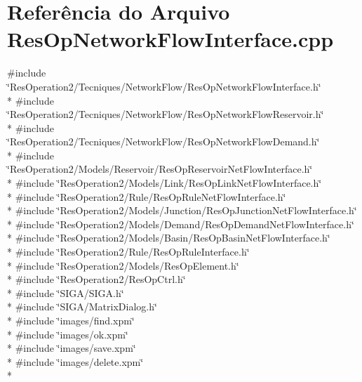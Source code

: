 \section{Referência do Arquivo Res\+Op\+Network\+Flow\+Interface.\+cpp}
\label{_res_op_network_flow_interface_8cpp}
{\ttfamily \#include \char`\"{}Res\+Operation2/\+Tecniques/\+Network\+Flow/\+Res\+Op\+Network\+Flow\+Interface.\+h\char`\"{}}\\*
{\ttfamily \#include \char`\"{}Res\+Operation2/\+Tecniques/\+Network\+Flow/\+Res\+Op\+Network\+Flow\+Reservoir.\+h\char`\"{}}\\*
{\ttfamily \#include \char`\"{}Res\+Operation2/\+Tecniques/\+Network\+Flow/\+Res\+Op\+Network\+Flow\+Demand.\+h\char`\"{}}\\*
{\ttfamily \#include \char`\"{}Res\+Operation2/\+Models/\+Reservoir/\+Res\+Op\+Reservoir\+Net\+Flow\+Interface.\+h\char`\"{}}\\*
{\ttfamily \#include \char`\"{}Res\+Operation2/\+Models/\+Link/\+Res\+Op\+Link\+Net\+Flow\+Interface.\+h\char`\"{}}\\*
{\ttfamily \#include \char`\"{}Res\+Operation2/\+Rule/\+Res\+Op\+Rule\+Net\+Flow\+Interface.\+h\char`\"{}}\\*
{\ttfamily \#include \char`\"{}Res\+Operation2/\+Models/\+Junction/\+Res\+Op\+Junction\+Net\+Flow\+Interface.\+h\char`\"{}}\\*
{\ttfamily \#include \char`\"{}Res\+Operation2/\+Models/\+Demand/\+Res\+Op\+Demand\+Net\+Flow\+Interface.\+h\char`\"{}}\\*
{\ttfamily \#include \char`\"{}Res\+Operation2/\+Models/\+Basin/\+Res\+Op\+Basin\+Net\+Flow\+Interface.\+h\char`\"{}}\\*
{\ttfamily \#include \char`\"{}Res\+Operation2/\+Rule/\+Res\+Op\+Rule\+Interface.\+h\char`\"{}}\\*
{\ttfamily \#include \char`\"{}Res\+Operation2/\+Models/\+Res\+Op\+Element.\+h\char`\"{}}\\*
{\ttfamily \#include \char`\"{}Res\+Operation2/\+Res\+Op\+Ctrl.\+h\char`\"{}}\\*
{\ttfamily \#include \char`\"{}S\+I\+G\+A/\+S\+I\+G\+A.\+h\char`\"{}}\\*
{\ttfamily \#include \char`\"{}S\+I\+G\+A/\+Matrix\+Dialog.\+h\char`\"{}}\\*
{\ttfamily \#include \char`\"{}images/find.\+xpm\char`\"{}}\\*
{\ttfamily \#include \char`\"{}images/ok.\+xpm\char`\"{}}\\*
{\ttfamily \#include \char`\"{}images/save.\+xpm\char`\"{}}\\*
{\ttfamily \#include \char`\"{}images/delete.\+xpm\char`\"{}}\\*

